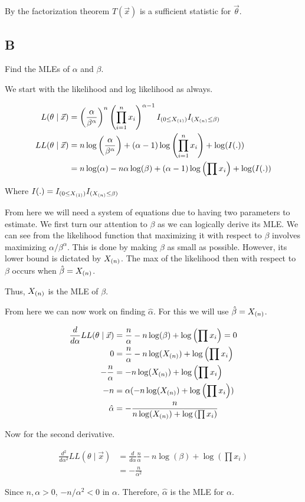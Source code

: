 By the factorization theorem $T(\vec{x})$ is a sufficient statistic for $\vec{\theta}$.

\pagebreak
\subsection*{B}

Find the MLEs of $\alpha$ and $\beta$.

We start with the likelihood and log likelihood as always.

\begin{align*}
	L(\theta \mid \vec{x}) &= \left( \frac{\alpha}{\beta^{\alpha}} \right)^n \left( \prod_{i=1}^n x_i \right)^{\alpha - 1} I_{(0 \leq X_{(1)})} I_{(X_{(n)} \leq \beta)} \\
	LL(\theta \mid \vec{x}) &= n\log\left( \frac{\alpha}{\beta^{\alpha}} \right) + (\alpha - 1)\log\left( \prod_{i=1}^n x_i \right) + \log(I(.)) \\
	&= n\log(\alpha) - n \alpha \log(\beta) + (\alpha - 1) \log\left( \prod x_i \right) + \log(I(.))
\end{align*}

Where $I(.) =  I_{(0 \leq X_{(1)})} I_{(X_{(n)} \leq \beta)}$

From here we will need a system of equations due to having two parameters to estimate. We first turn our attention to $\beta$ as we can logically derive its MLE. We can see from the likelihood function that maximizing it with respect to $\beta$ involves maximizing $\alpha/\beta^{\alpha}$. This is done by making $\beta$ as small as possible. However, its lower bound is dictated by $X_{(n)}$. The max of the likelihood then with respect to $\beta$ occurs when $\hat{\beta} = X_{(n)}$. 

Thus, $X_{(n)}$ is the MLE of $\beta$.

From here we can now work on finding $\hat{\alpha}$. For this we will use $\hat{\beta} = X_{(n)}$.

\begin{align*}
	\frac{d}{d\alpha} LL(\theta \mid \vec{x}) &= \frac{n}{\alpha} - n\log(\beta) + \log\left( \prod x_i \right) = 0 \\
	0 &=  \frac{n}{\alpha} - n\log(X_{(n)}) + \log\left( \prod x_i \right) \\
	-\frac{n}{\alpha} &= - n\log(X_{(n)}) + \log\left( \prod x_i \right) \\
	-n &= \alpha( - n\log(X_{(n)}) + \log\left( \prod x_i \right) ) \\
	\hat{\alpha} &= -\frac{n}{n\log(X_{(n)}) + \log\left( \prod x_i \right)}
\end{align*}

Now for the second derivative.

\vspace{-5mm}
\begin{align*}
	\frac{d^2}{d \alpha^2} LL(\theta \mid \vec{x}) &= \frac{d}{d \alpha}  \frac{n}{\alpha} - n\log(\beta) + \log\left( \prod x_i \right) \\
	&= -\frac{n}{\alpha^2}
\end{align*}

Since $n, \alpha > 0$, $-n/\alpha^2 < 0$ in $\alpha$. Therefore, $\hat{\alpha}$ is the MLE for $\alpha$.
